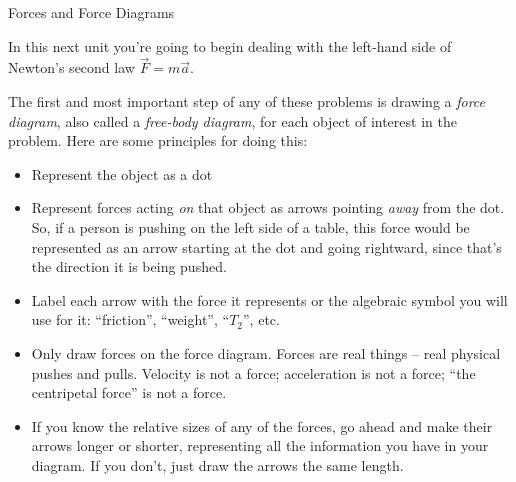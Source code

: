 \documentclass[12pt]{article}
\newcommand{\BC}{\begin{center}}
\newcommand{\EC}{\end{center}}
\newcommand{\BI}{\begin{itemize}}
\newcommand{\EI}{\end{itemize}}
\begin{document}
\Large
\centerline{}

\normalsize
\centerline{}

\medskip

\BC
{\Large Forces and Force Diagrams} 
\EC

In this next unit you're going to begin dealing with the left-hand side of Newton's second law $\vec F = m \vec a$.

The first and most important step of any of these problems is drawing a {\it force diagram}, also called a {\it free-body diagram}, for 
each object of interest in the problem. Here are some principles for doing this:

\BI
\item Represent the object as a dot
\item Represent forces acting {\it on} that object as arrows pointing {\it away} from the dot. So, if a person is pushing on the left side of a 
  table, this force would be represented as an arrow starting at the dot and going rightward, since that's the direction it is being pushed.
\item Label each arrow with the force it represents or the algebraic symbol you will use for it: ``friction'', ``weight'', ``$T_2$'', etc.
\item Only draw forces on the force diagram. Forces are real things -- real physical pushes and pulls. Velocity is not a force; acceleration is not
  a force; ``the centripetal force'' is not a force. 
\item If you know the relative sizes of any of the forces, go ahead and make their arrows longer or shorter, representing all the information
  you have in your diagram. If you don't, just draw the arrows the same length.
\EI

\newpage
\end{document}

